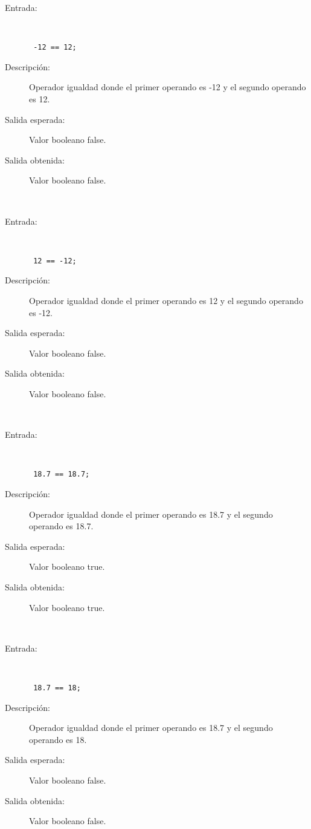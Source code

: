 	\begin{description}
		\item [Entrada:] \hfill \\
\begin{lstlisting}
 -12 == 12;
\end{lstlisting}
		\item [Descripción:] Operador igualdad donde el primer operando es -12 y el segundo operando es  12.
		\item [Salida esperada:] Valor booleano false.
		\item [Salida obtenida:] Valor booleano false.
	\end{description}
\hfil \\
	\begin{description}
		\item [Entrada:] \hfill \\
\begin{lstlisting}
 12 == -12;
\end{lstlisting}
		\item [Descripción:] Operador igualdad donde el primer operando es 12 y el segundo operando es  -12.
		\item [Salida esperada:] Valor booleano false.
		\item [Salida obtenida:] Valor booleano false.
	\end{description}
\hfil \\
	\begin{description}
		\item [Entrada:] \hfill \\
\begin{lstlisting}
 18.7 == 18.7;
\end{lstlisting}
		\item [Descripción:] Operador igualdad donde el primer operando es 18.7 y el segundo operando es  18.7.
		\item [Salida esperada:] Valor booleano true.
		\item [Salida obtenida:] Valor booleano true.
	\end{description}
\hfil \\
	\begin{description}
		\item [Entrada:] \hfill \\
\begin{lstlisting}
 18.7 == 18;
\end{lstlisting}
		\item [Descripción:] Operador igualdad donde el primer operando es 18.7 y el segundo operando es  18.
		\item [Salida esperada:] Valor booleano false.
		\item [Salida obtenida:] Valor booleano false.
	\end{description}
